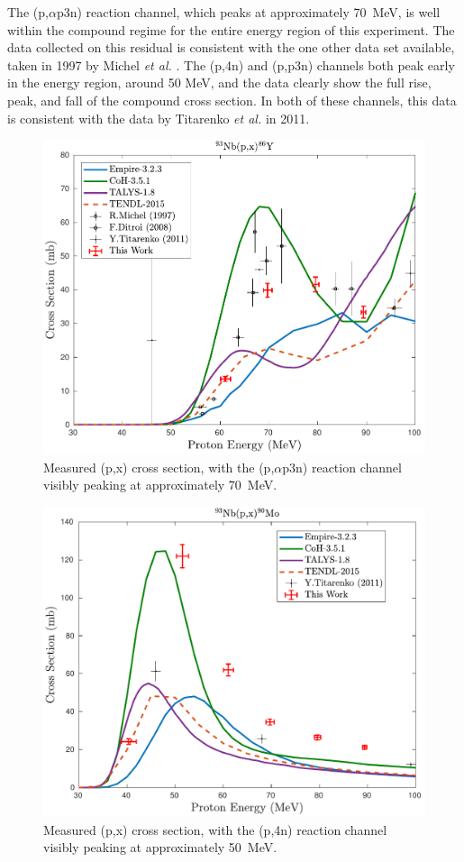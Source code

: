 \documentclass[3p]{elsarticle}
\begin{document}
The (p,$\alpha$p3n) reaction channel, which peaks at approximately \mbox{70 MeV}, is well within the compound regime for the entire energy region of this experiment.
The data collected on this residual is consistent with the one other data set available, taken in 1997 by Michel \emph{et al.} \cite{MICHEL1997153}. 
The (p,4n) and (p,p3n) channels both peak early in the energy region, around 50 MeV, and the data clearly show the full rise, peak, and fall of the compound cross section. 
In both of these channels, this data  is consistent with the data by Titarenko \emph{et al.} in 2011\cite{Titarenko2011}.

\begin{figure}
 \centering
 \includegraphics[width=0.5\linewidth]{./figures/86Y.pdf}
 \caption{Measured (p,x) cross section, with the (p,$\alpha$p3n) reaction channel visibly peaking at approximately \mbox{70 MeV}.}
 \label{fig:86Y}
\end{figure}




\begin{figure}
 \centering
 \includegraphics[width=0.5\linewidth]{./figures/90Mo.pdf}
 \caption{Measured (p,x) cross section, with the (p,4n) reaction channel visibly peaking at approximately \mbox{50 MeV}.}
 \label{fig:90Mo}
\end{figure}
\end{document}
